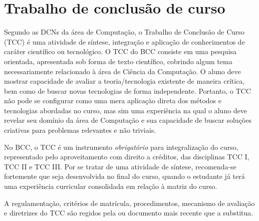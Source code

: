 \section{Trabalho de conclusão de curso}
\label{sec:trabalho_conclusao_curso}

Segundo as DCNs da área de Computação, o Trabalho de Conclusão de Curso (TCC) é uma atividade de síntese, integração e aplicação de conhecimentos de caráter científico ou tecnológico. O TCC do BCC consiste em uma pesquisa orientada, apresentada sob forma de texto científico, cobrindo algum tema necessariamente relacionado à área de Ciência da Computação. 
O aluno deve mostrar capacidade de avaliar a teoria/tecnologia existente de maneira
crítica, bem como de buscar novas tecnologias de forma independente.
Portanto, o TCC não pode se configurar como uma mera aplicação direta dos
métodos e tecnologias abordadas no curso, mas sim uma experiência na qual o
aluno deve revelar seu domínio da área de Computação e sua capacidade de buscar
soluções criativas para problemas relevantes e não triviais.


No BCC, o TCC é um instrumento \textit{obrigatório} para integralização do curso, representado pelo aproveitamento com direito a créditos, das disciplinas TCC I, TCC II e TCC III. Por se tratar de uma atividade de síntese, recomenda-se fortemente que seja desenvolvida no final do curso, quando o estudante já terá uma experiência curricular consolidada em relação à matriz do curso.

A regulamentação, critérios de matrícula, procedimentos, mecanismo de avaliação e diretrizes do TCC são regidos pela  ou documento mais recente que a substitua. 
